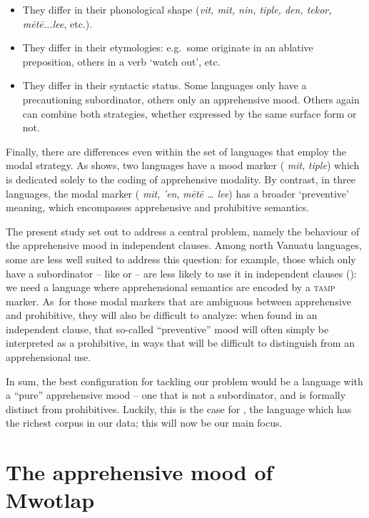 \documentclass[output=paper,colorlinks,citecolor=brown]{langscibook}
\begin{document}
\begin{itemize}
    \item They differ in their phonological shape (\textit{vit, mit, nin, tiple, den, tekor, mētē...lee}, etc.).
    \item They differ in their etymologies: e.g.\ some originate in an ablative preposition, others in a verb `watch out', etc.
    \item They differ in their syntactic status. Some languages only have a precautioning subordinator, others only an apprehensive mood. Others again can combine both strategies, whether expressed by the same surface form or not.
\end{itemize}

Finally, there are differences even within the set of languages that employ the modal strategy. As  shows, two languages have a mood marker ( \textit{mit},  \textit{tiple}) which is dedicated solely to the coding of apprehensive modality. By contrast, in three languages, the modal marker ( \textit{mit},  \textit{'en},  \textit{mētē {\ldots} lee}) has a broader `preventive' meaning, which encompasses apprehensive and prohibitive semantics.

The present study set out to address a central problem, namely the behaviour of the apprehensive mood in independent clauses. Among north Vanuatu languages, some are less well suited to address this question: for example, those which only have a subordinator -- like  or  -- are less likely to use it in independent clauses (): we need a language where apprehensional semantics are encoded by a \textsc{tamp} marker. As~for those modal markers that are ambiguous between apprehensive and prohibitive, they will also be difficult to analyze: when found in an independent clause, that so-called ``preventive'' mood will often simply be interpreted as a prohibitive, in ways that will be difficult to distinguish from an apprehensional use.

In sum, the best configuration for tackling our problem would be a language with a ``pure'' apprehensive mood -- one that is not a subordinator, and is formally distinct from prohibitives. Luckily, this is the case for , the language which has the richest corpus in our data; this will now be our main focus.




\section{The apprehensive mood of Mwotlap}
\label{sec:moodmwotlap}
\end{document}

